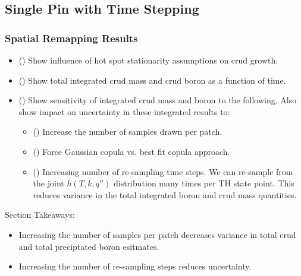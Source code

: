 \subsection{Single Pin with Time Stepping}

\subsubsection{Spatial Remapping Results}
\begin{itemize}
    \item (\checkmark) Show influence of hot spot stationarity assumptions on crud growth.
\end{itemize}

\begin{itemize}
    \item (\checkmark) Show total integrated crud mass and crud boron as a function of time.
    \item (\checkmark) Show sensitivity of integrated crud mass and boron to the following.  Also show impact on uncertainty in these integrated results to:
        \begin{itemize}
            \item (\checkmark) Increase the number of samples drawn per patch.
            \item (\checkmark) Force Gaussian copula vs. best fit copula approach.
            \item (\checkmark) Increasing number of re-sampling time steps.
                We can re-sample from the joint $h(T, k, q'')$ distribution many times per TH state point.
                This reduces variance in the total integrated boron and crud mass quantities.
        \end{itemize}
\end{itemize}

Section Takeaways:
\begin{itemize}
    \item Increasing the number of samples per patch decreases variance in total crud and total preciptated boron esitmates.
    \item Increasing the number of re-sampling steps reduces uncertainty.
\end{itemize}
